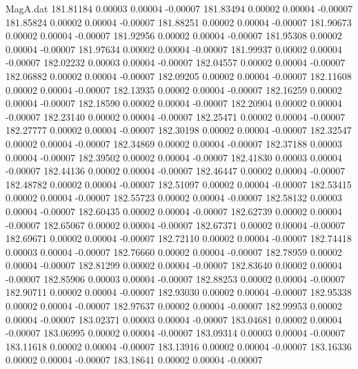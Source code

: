 \begin{filecontents}{MagA.dat}
 181.81184    0.00003    0.00004   -0.00007
 181.83494    0.00002    0.00004   -0.00007
 181.85824    0.00002    0.00004   -0.00007
 181.88251    0.00002    0.00004   -0.00007
 181.90673    0.00002    0.00004   -0.00007
 181.92956    0.00002    0.00004   -0.00007
 181.95308    0.00002    0.00004   -0.00007
 181.97634    0.00002    0.00004   -0.00007
 181.99937    0.00002    0.00004   -0.00007
 182.02232    0.00003    0.00004   -0.00007
 182.04557    0.00002    0.00004   -0.00007
 182.06882    0.00002    0.00004   -0.00007
 182.09205    0.00002    0.00004   -0.00007
 182.11608    0.00002    0.00004   -0.00007
 182.13935    0.00002    0.00004   -0.00007
 182.16259    0.00002    0.00004   -0.00007
 182.18590    0.00002    0.00004   -0.00007
 182.20904    0.00002    0.00004   -0.00007
 182.23140    0.00002    0.00004   -0.00007
 182.25471    0.00002    0.00004   -0.00007
 182.27777    0.00002    0.00004   -0.00007
 182.30198    0.00002    0.00004   -0.00007
 182.32547    0.00002    0.00004   -0.00007
 182.34869    0.00002    0.00004   -0.00007
 182.37188    0.00003    0.00004   -0.00007
 182.39502    0.00002    0.00004   -0.00007
 182.41830    0.00003    0.00004   -0.00007
 182.44136    0.00002    0.00004   -0.00007
 182.46447    0.00002    0.00004   -0.00007
 182.48782    0.00002    0.00004   -0.00007
 182.51097    0.00002    0.00004   -0.00007
 182.53415    0.00002    0.00004   -0.00007
 182.55723    0.00002    0.00004   -0.00007
 182.58132    0.00003    0.00004   -0.00007
 182.60435    0.00002    0.00004   -0.00007
 182.62739    0.00002    0.00004   -0.00007
 182.65067    0.00002    0.00004   -0.00007
 182.67371    0.00002    0.00004   -0.00007
 182.69671    0.00002    0.00004   -0.00007
 182.72110    0.00002    0.00004   -0.00007
 182.74418    0.00003    0.00004   -0.00007
 182.76660    0.00002    0.00004   -0.00007
 182.78959    0.00002    0.00004   -0.00007
 182.81299    0.00002    0.00004   -0.00007
 182.83640    0.00002    0.00004   -0.00007
 182.85906    0.00003    0.00004   -0.00007
 182.88253    0.00002    0.00004   -0.00007
 182.90711    0.00002    0.00004   -0.00007
 182.93030    0.00002    0.00004   -0.00007
 182.95338    0.00002    0.00004   -0.00007
 182.97637    0.00002    0.00004   -0.00007
 182.99953    0.00002    0.00004   -0.00007
 183.02371    0.00003    0.00004   -0.00007
 183.04681    0.00002    0.00004   -0.00007
 183.06995    0.00002    0.00004   -0.00007
 183.09314    0.00003    0.00004   -0.00007
 183.11618    0.00002    0.00004   -0.00007
 183.13916    0.00002    0.00004   -0.00007
 183.16336    0.00002    0.00004   -0.00007
 183.18641    0.00002    0.00004   -0.00007

\end{filecontents}
